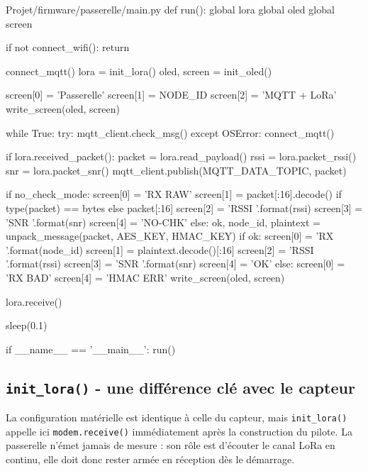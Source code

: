 \documentclass[a4paper,11pt]{report}
\begin{document}
\begin{pycode}{Projet/firmware/passerelle/main.py}
def run():
    global lora
    global oled
    global screen

    if not connect_wifi():
        return

    connect_mqtt()
    lora = init_lora()
    oled, screen = init_oled()

    screen[0] = 'Passerelle'
    screen[1] = NODE_ID
    screen[2] = 'MQTT + LoRa'
    write_screen(oled, screen)

    while True:
        try:
            mqtt_client.check_msg()
        except OSError:
            connect_mqtt()

        if lora.received_packet():
            packet = lora.read_payload()
            rssi = lora.packet_rssi()
            snr = lora.packet_snr()
            mqtt_client.publish(MQTT_DATA_TOPIC, packet)

            if no_check_mode:
                screen[0] = 'RX RAW'
                screen[1] = packet[:16].decode() if type(packet) == bytes else packet[:16]
                screen[2] = 'RSSI {}'.format(rssi)
                screen[3] = 'SNR {}'.format(snr)
                screen[4] = 'NO-CHK'
            else:
                ok, node_id, plaintext = unpack_message(packet, AES_KEY, HMAC_KEY)
                if ok:
                    screen[0] = 'RX {}'.format(node_id)
                    screen[1] = plaintext.decode()[:16]
                    screen[2] = 'RSSI {}'.format(rssi)
                    screen[3] = 'SNR {}'.format(snr)
                    screen[4] = 'OK'
                else:
                    screen[0] = 'RX BAD'
                    screen[4] = 'HMAC ERR'
            write_screen(oled, screen)

            lora.receive()

        sleep(0.1)


if __name__ == '__main__':
    run()
\end{pycode}

\subsection{\texttt{init\_lora()} - une différence clé avec le capteur}
La configuration matérielle est identique à celle du capteur, mais \texttt{init\_lora()} appelle ici
\texttt{modem.receive()} immédiatement après la construction du pilote. La passerelle n'émet jamais de
mesure : son rôle est d'écouter le canal LoRa en continu, elle doit donc rester armée en réception dès
le démarrage.
\end{document}
